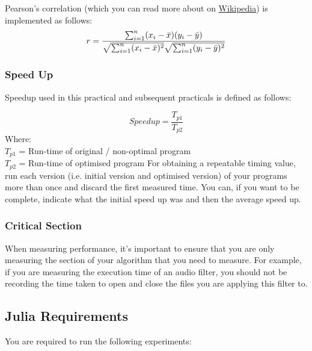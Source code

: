Pearson's correlation (which you can read more about on \href{https://en.wikipedia.org/wiki/Pearson_correlation_coefficient}{Wikipedia}) is implemented as follows:
\begin{equation}
\label{eqn:Pearson}
  r =
  \frac{ \sum_{i=1}^{n}(x_i-\bar{x})(y_i-\bar{y}) }{%
        \sqrt{\sum_{i=1}^{n}(x_i-\bar{x})^2}\sqrt{\sum_{i=1}^{n}(y_i-\bar{y})^2}}
\end{equation}

\subsubsection{Speed Up}
Speedup used in this practical and subsequent practicals is defined as follows:

\begin{equation}
Speedup = \frac{T_{p1}}{T_{p2}}
\end{equation}
Where:\\
$T_{p1}$ = Run-time of original / non-optimal program\\
$T_{p2}$ = Run-time of optimised program
For obtaining a repeatable timing value, run each version (i.e. initial version and optimised version) of your programs more than once and discard the first measured time. You can, if you want to be complete, indicate what the initial speed up was and then the average speed up.

\subsubsection{Critical Section}
When measuring performance, it's important to ensure that you are only measuring the section of your algorithm that you need to measure. For example, if you are measuring the execution time of an audio filter, you should not be recording the time taken to open and close the files you are applying this filter to.

\newpage

\subsection{Julia Requirements}
You are required to run the following experiments:

